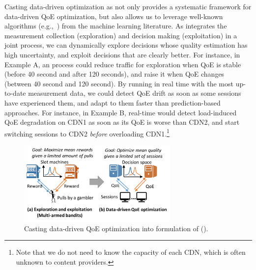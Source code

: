 Casting data-driven optimization as \mab not only provides 
a systematic framework for data-driven QoE optimization, 
but also allows us to leverage well-known algorithms (e.g.,~\cite{ucb1}) from the  machine learning literature.  
As \mab integrates the measurement collection (exploration) and 
decision making (exploitation) in a joint process,
we can dynamically explore decisions whose 
quality estimation has high uncertainty, and exploit decisions
that are clearly better.  For instance, in Example A, an \mab process could
 reduce traffic for exploration when QoE is stable (before 40
second and after 120 seconds), and raise it when QoE changes
(between 40 second and 120 second).  By running \mab in real time with the
most up-to-date measurement data, we could detect QoE drift as soon as some
sessions have experienced them, and adapt to them faster than
prediction-based approaches.  For instance, in Example B, real-time \mab
would detect load-induced QoE degradation on CDN1 as soon as its QoE is
worse than CDN2, and start switching sessions to CDN2 {\em before} overloading
CDN1.\footnote{Note that we do not need to know the capacity of each CDN, which is often unknown to content providers.}  


 




\begin{figure}[t!]
\centering
\includegraphics[width=0.7\textwidth]{figures/pytheas-casting.pdf}
\caption{Casting data-driven QoE optimization into formulation of \mablong (\mab).}
\label{fig:casting}
\end{figure}

